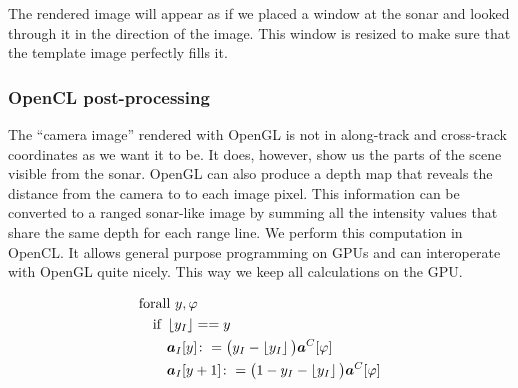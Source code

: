 The rendered image will appear as if we placed a window at the sonar and looked through it in the direction of the image. This window is resized to make sure that the template image perfectly fills it.


\subsubsection{OpenCL post-processing}

The ``camera image'' rendered with OpenGL is not in along-track and cross-track coordinates as we want it to be. It does, however, show us the parts of the scene visible from the sonar. OpenGL can also produce a depth map that reveals the distance from the camera to to each image pixel. This information can be converted to a ranged sonar-like image by summing all the intensity values that share the same depth for each range line. We perform this computation in OpenCL. It allows general purpose programming on GPUs and can interoperate with OpenGL quite nicely. This way we keep all calculations on the GPU.

\begin{align}
&\text{forall } y,\varphi \nonumber\\
&\quad\text{if }\left\lfloor y_I\right\rfloor == y \nonumber\\
&\qquad\boldsymbol{a}_I[y] \colon= \big(y_I - \left\lfloor y_I\right\rfloor\big)\boldsymbol{a}^C[\varphi] \nonumber\\
&\qquad\boldsymbol{a}_I[y+1] \colon= \big(1 - y_I - \left\lfloor y_I\right\rfloor\big)\boldsymbol{a}^C[\varphi]
\end{align}


